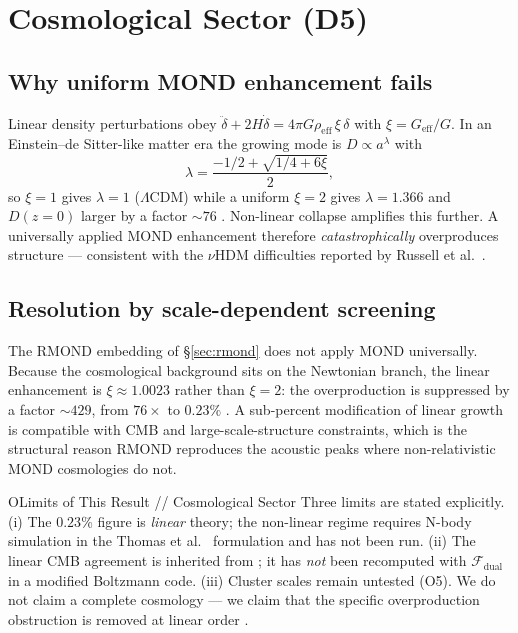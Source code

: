 \documentclass[aps,prd,preprint,superscriptaddress,nofootinbib,amsmath,amssymb,floatfix]{revtex4-2}
\makeatletter
\DeclareRobustCommand{\_}{%
    \ifmmode\nfss@text{\textunderscore}\else\textunderscore\penalty\z@\fi}%
\makeatother
\begin{document}
\section{Cosmological Sector (D5)}
\label{sec:cosmo}

\subsection{Why uniform MOND enhancement fails}

Linear density perturbations obey $\ddot\delta + 2H\dot\delta = 4\pi G\rho_{\text{eff}}\,\xi\,\delta$ with $\xi = G_{\text{eff}}/G$. In an Einstein--de Sitter-like matter era the growing mode is $D\propto a^\lambda$ with
\begin{equation}
\lambda = \frac{-1/2 + \sqrt{1/4 + 6\xi}}{2},
\end{equation}
so $\xi=1$ gives $\lambda=1$ ($\Lambda$CDM) while a uniform $\xi=2$ gives $\lambda=1.366$ and $D(z=0)$ larger by a factor $\sim76$ . Non-linear collapse amplifies this further. A universally applied MOND enhancement therefore \emph{catastrophically} overproduces structure --- consistent with the $\nu$HDM difficulties reported by Russell et al.~\cite{Russell2026}.

\subsection{Resolution by scale-dependent screening}

The RMOND embedding of \S\ref{sec:rmond} does not apply MOND universally. Because the cosmological background sits on the Newtonian branch, the linear enhancement is $\xi \approx 1.0023$ rather than $\xi = 2$: the overproduction is suppressed by a factor $\sim429$, from $76\times$ to $0.23\%$ . A sub-percent modification of linear growth is compatible with CMB and large-scale-structure constraints, which is the structural reason RMOND reproduces the acoustic peaks where non-relativistic MOND cosmologies do not.

\begin{gate}{O}{Limits of This Result // Cosmological Sector}
Three limits are stated explicitly. (i) The $0.23\%$ figure is \emph{linear} theory; the non-linear regime requires N-body simulation in the Thomas et al.~\cite{Thomas2023} formulation and has not been run. (ii) The linear CMB agreement is inherited from \cite{SkordisZlosnik2021}; it has \emph{not} been recomputed with $\mathcal{F}_{\text{dual}}$ in a modified Boltzmann code. (iii) Cluster scales remain untested (O5). We do not claim a complete cosmology --- we claim that the specific overproduction obstruction is removed at linear order .
\end{gate}
\end{document}

